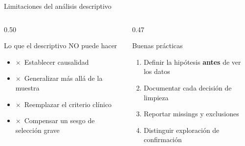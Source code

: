 \documentclass[aspectratio=169,10pt]{beamer}
\newcommand{\no}{\textcolor{UCred}{$\boldsymbol{\times}$}}
\begin{document}
\begin{frame}{Limitaciones del análisis descriptivo}
  \begin{columns}[T]
    \begin{column}{0.50\textwidth}
      \begin{block}{Lo que el descriptivo NO puede hacer}
        \begin{itemize}\small
          \item \no\ Establecer causalidad
          \item \no\ Generalizar más allá de la muestra
          \item \no\ Reemplazar el criterio clínico
          \item \no\ Compensar un sesgo de selección grave
        \end{itemize}
      \end{block}
    \end{column}
    \begin{column}{0.47\textwidth}
      \vspace{3mm}
      \begin{exampleblock}{Buenas prácticas}
        \begin{enumerate}\small
          \item Definir la hipótesis \textbf{antes} de ver los datos
          \item Documentar cada decisión de limpieza
          \item Reportar missings y exclusiones
          \item Distinguir exploración de confirmación
        \end{enumerate}
      \end{exampleblock}
    \end{column}
  \end{columns}
\end{frame}
\end{document}
